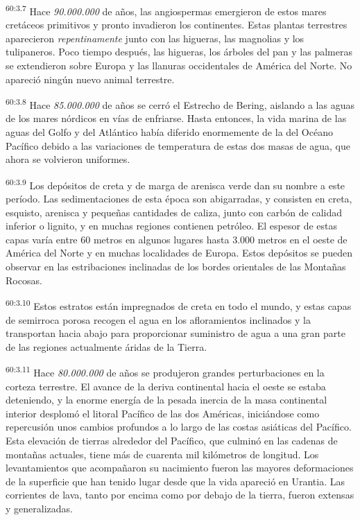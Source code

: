 \par
\textsuperscript{60:3.7} Hace \textit{90.000.000} de años, las angiospermas emergieron de estos mares cretáceos primitivos y pronto invadieron los continentes. Estas plantas terrestres aparecieron \textit{repentinamente} junto con las higueras, las magnolias y los tulipaneros. Poco tiempo después, las higueras, los árboles del pan y las palmeras se extendieron sobre Europa y las llanuras occidentales de América del Norte. No apareció ningún nuevo animal terrestre.

\par
\textsuperscript{60:3.8} Hace \textit{85.000.000} de años se cerró el Estrecho de Bering, aislando a las aguas de los mares nórdicos en vías de enfriarse. Hasta entonces, la vida marina de las aguas del Golfo y del Atlántico había diferido enormemente de la del Océano Pacífico debido a las variaciones de temperatura de estas dos masas de agua, que ahora se volvieron uniformes.

\par
\textsuperscript{60:3.9} Los depósitos de creta y de marga de arenisca verde dan su nombre a este período. Las sedimentaciones de esta época son abigarradas, y consisten en creta, esquisto, arenisca y pequeñas cantidades de caliza, junto con carbón de calidad inferior o lignito, y en muchas regiones contienen petróleo. El espesor de estas capas varía entre 60 metros en algunos lugares hasta 3.000 metros en el oeste de América del Norte y en muchas localidades de Europa. Estos depósitos se pueden observar en las estribaciones inclinadas de los bordes orientales de las Montañas Rocosas.

\par
\textsuperscript{60:3.10} Estos estratos están impregnados de creta en todo el mundo, y estas capas de semirroca porosa recogen el agua en los afloramientos inclinados y la transportan hacia abajo para proporcionar suministro de agua a una gran parte de las regiones actualmente áridas de la Tierra.

\par
\textsuperscript{60:3.11} Hace \textit{80.000.000} de años se produjeron grandes perturbaciones en la corteza terrestre. El avance de la deriva continental hacia el oeste se estaba deteniendo, y la enorme energía de la pesada inercia de la masa continental interior desplomó el litoral Pacífico de las dos Américas, iniciándose como repercusión unos cambios profundos a lo largo de las costas asiáticas del Pacífico. Esta elevación de tierras alrededor del Pacífico, que culminó en las cadenas de montañas actuales, tiene más de cuarenta mil kilómetros de longitud. Los levantamientos que acompañaron su nacimiento fueron las mayores deformaciones de la superficie que han tenido lugar desde que la vida apareció en Urantia. Las corrientes de lava, tanto por encima como por debajo de la tierra, fueron extensas y generalizadas.

